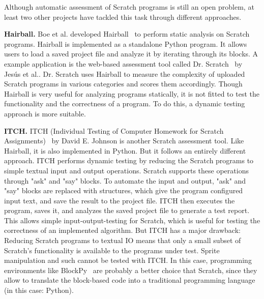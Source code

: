 Although automatic assessment of Scratch programs is still an open problem,
at least two other projects have tackled this task through different approaches.

\textbf{Hairball.}
Boe et al. developed Hairball~\cite{hairball} to perform static analysis on Scratch programs.
Hairball is implemented as a standalone Python program.
It allows users to load a saved project file and analyze it by iterating through its blocks.
A example application is the web-based assessment tool called Dr. Scratch~\cite{drscratch} by Jes\'{u}s et al..
Dr. Scratch uses Hairball to measure the complexity of uploaded Scratch programs in various categories and scores them accordingly.
Though Hairball is very useful for analyzing programs statically, it is not fitted to test the functionality and the correctness of a program.
To do this, a dynamic testing approach is more suitable.

\textbf{ITCH.}
ITCH (Individual Testing of Computer Homework for Scratch Assignments)~\cite{itch} by David E. Johnson is another Scratch assessment tool.
Like Hairball, it is also implemented in Python.
But it follows an entirely different approach.
ITCH performs dynamic testing by reducing the Scratch programs to simple textual input and output operations.
Scratch supports these operations through "ask" and "say" blocks.
To automate the input and output, "ask" and "say" blocks are replaced with structures, which give the program configured input text, and save the result to the project file.
ITCH then executes the program, saves it, and analyzes the saved project file to generate a test report.
This allows simple input-output-testing for Scratch, which is useful for testing the correctness of an implemented algorithm.
But ITCH has a major drawback: Reducing Scratch programs to textual IO means that only a small subset of Scratch's functionality is available to the programs under test.
Sprite manipulation and such cannot be tested with ITCH.
In this case, programming environments like BlockPy~\cite{blockpy} are probably a better choice that Scratch,
since they allow to translate the block-based code into a traditional programming language (in this case: Python).

